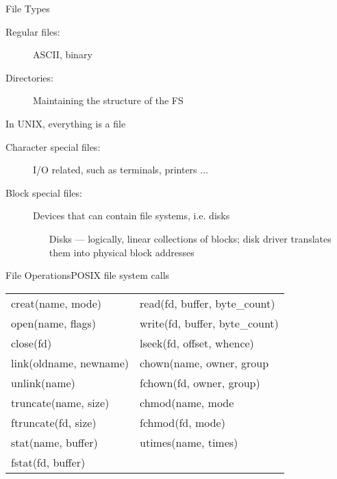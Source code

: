 \begin{frame}{File Types}
  \begin{description}
  \item[Regular files:] ASCII, binary
  \item[Directories:] Maintaining the structure of the FS
  \end{description}
  \begin{block}{In UNIX, everything is a file}
    \begin{description}
    \item[Character special files:] I/O related, such as terminals, printers ...
    \item[Block special files:] Devices that can contain file systems, i.e. disks
      \begin{itemize}
      \item[Disks] --- logically, linear collections of blocks; disk driver translates
        them into physical block addresses
      \end{itemize}
    \end{description}
  \end{block}
\end{frame}

\begin{frame}{File Operations}{POSIX file system calls}%
  \begin{tabular}{>{\ttfamily}l|>{\ttfamily}l}
    creat(name, mode)&read(fd, buffer, byte\_count)\\
    open(name, flags)&write(fd, buffer, byte\_count)\\
    close(fd)&lseek(fd, offset, whence)\\
    link(oldname, newname)&chown(name, owner, group\\
    unlink(name)&fchown(fd, owner, group)\\        
    truncate(name, size)&chmod(name, mode\\
    ftruncate(fd, size)&fchmod(fd, mode)\\
    stat(name, buffer)&utimes(name, times)\\
    fstat(fd, buffer)&\\
  \end{tabular}
\end{frame}

